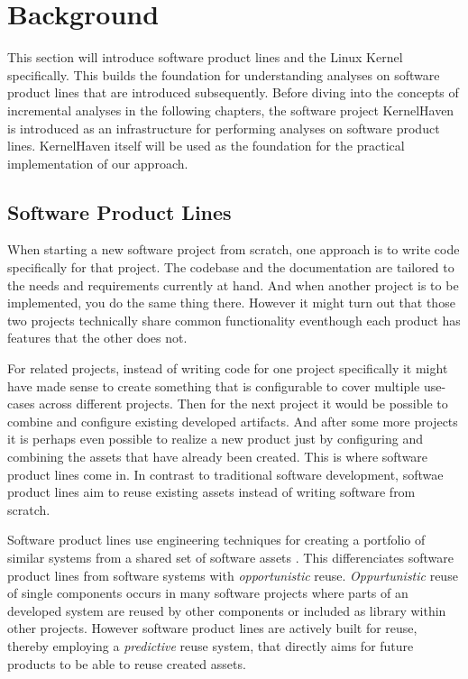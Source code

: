 \documentclass[a4paper]{article}
\begin{document}
\clearpage
\section{Background} \label{background}

This section will introduce software product lines and the Linux Kernel  specifically. This builds the foundation for understanding analyses on software product lines that are introduced subsequently. Before diving into the concepts of incremental analyses in the following chapters, the software project KernelHaven is introduced as an infrastructure for performing analyses on software product lines. KernelHaven itself will be used as the foundation for the practical implementation of our approach.

\subsection{Software Product Lines}\label{spl}

When starting a new software project from scratch, one approach is to write code specifically for that project. The codebase and the documentation are tailored to the needs and requirements currently at hand. And when another project is to be implemented, you do the same thing there. However it might turn out that those two projects technically share common functionality eventhough each product has features that the other does not.

For related projects, instead of writing code for one project specifically it might have made sense to create something that is configurable to cover multiple use-cases across different projects. Then for the next project it would be possible to combine and configure existing developed artifacts. And after some more projects it is perhaps even possible to realize a new product just by configuring and combining the assets that have already been created. This is where software product lines come in. In contrast to traditional software development, softwae product lines aim to reuse existing assets instead of writing software from scratch.

Software product lines use engineering techniques for creating a portfolio of similar systems from a shared set of software assets \cite{intro-spl}. This differenciates software product lines from software systems with \emph{opportunistic} reuse. \emph{Oppurtunistic} reuse of single components occurs in many software projects where parts of an developed system are reused by other components or included as library within other projects. However software product lines are actively built for reuse, thereby employing a \emph{predictive} reuse system, that directly aims for future products to be able to reuse created assets.
\end{document}
